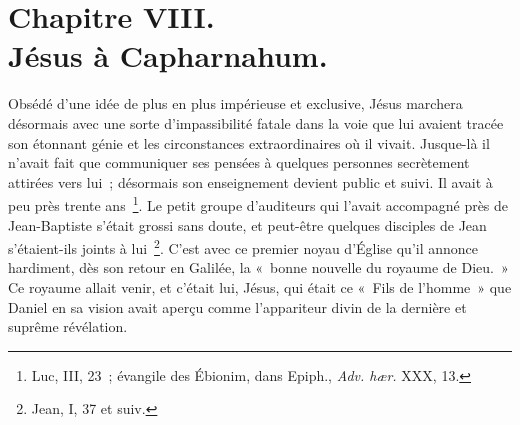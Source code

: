 \documentclass[french,twoside]{book} %
\newcommand\chapteropen{} %
\newcommand\chaptercont{} %
\begin{document}
\chapteropen
\chapter[{Chapitre VIII. Jésus à Capharnahum.}]{Chapitre VIII.\\
Jésus à Capharnahum.}\renewcommand{\leftmark}{Chapitre VIII.\\
Jésus à Capharnahum.}


\chaptercont
\noindent Obsédé d’une idée de plus en plus impérieuse et exclusive, Jésus marchera désormais avec une sorte d’impassibilité fatale dans la voie que lui avaient tracée son étonnant génie et les circonstances extraordinaires où il vivait. Jusque-là il n’avait fait que communiquer ses pensées à quelques personnes secrètement attirées vers lui ; désormais son enseignement devient public et suivi. Il avait à peu près trente ans \footnote{ Luc, III, 23 ; évangile des Ébionim, dans Epiph., {\itshape Adv. hær.} XXX, 13.}. Le petit groupe d’auditeurs qui l’avait accompagné près de Jean-Baptiste s’était grossi sans doute, et peut-être quelques disciples de Jean s’étaient-ils joints à lui \footnote{Jean, I, 37 et suiv.}. C’est avec ce premier noyau d’Église qu’il annonce hardiment, dès son retour en Galilée, la « bonne nouvelle du royaume de Dieu. » Ce royaume allait venir, et c’était lui, Jésus, qui était ce « Fils de l’homme » que Daniel en sa vision avait aperçu comme l’appariteur divin de la dernière et suprême révélation.\par
\end{document}
